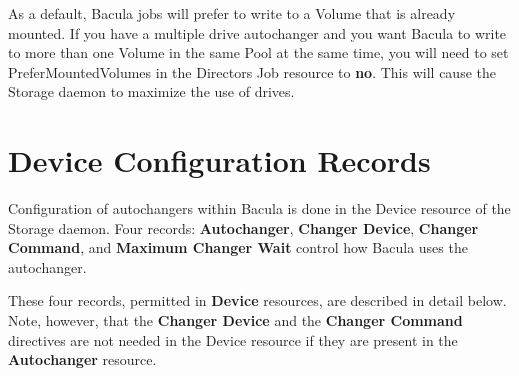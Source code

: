 As a default, Bacula jobs will prefer to write to a Volume that is
already mounted. If you have a multiple drive autochanger and you want
Bacula to write to more than one Volume in the same Pool at the same
time, you will need to set  {PreferMountedVolumes}
in the Directors Job resource to {\bf no}. This will cause
the Storage daemon to maximize the use of drives.


\label{ConfigRecords}
\section{Device Configuration Records}

Configuration of autochangers within Bacula is done in the Device resource of
the Storage daemon. Four records: {\bf Autochanger}, {\bf Changer Device},
{\bf Changer Command}, and {\bf Maximum Changer Wait} control how Bacula uses
the autochanger. 

These four records, permitted in {\bf Device} resources, are described in
detail below. Note, however, that the {\bf Changer Device} and the 
{\bf Changer Command} directives are not needed in the Device resource
if they are present in the {\bf Autochanger} resource.

